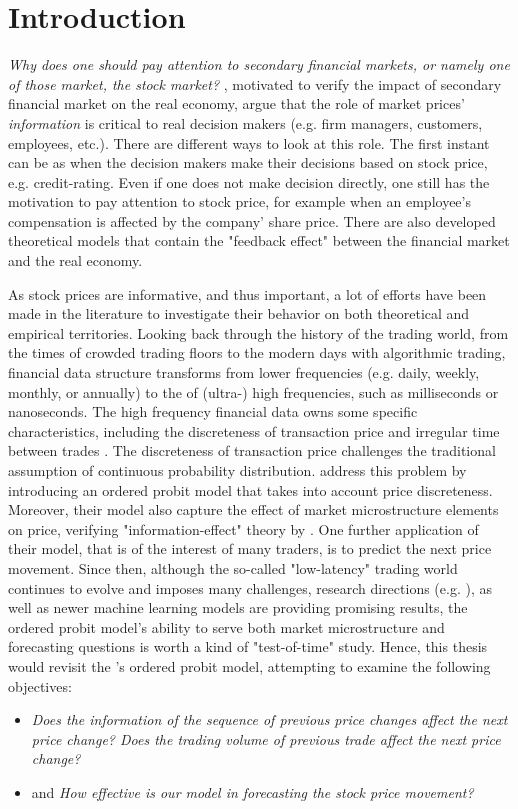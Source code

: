 \chapter{Introduction}\label{chap:introduction}

\textit{Why does one should pay attention to secondary financial markets, or namely one of those market, the stock market?} \citet{bondetal2012}, motivated to verify the impact of secondary financial market on the real economy, argue that the role of market prices' \textit{information} is critical to real decision makers (e.g. firm managers, customers, employees, etc.). There are different ways to look at this role. The first instant can be as when the decision makers make their decisions based on stock price, e.g. credit-rating. Even if one does not make decision directly, one still has the motivation to pay attention to stock price, for example when an employee's compensation is affected by the company' share price. There are also developed theoretical models that contain the "feedback effect" between the financial market and the real economy.

As stock prices are informative, and thus important, a lot of efforts have been made in the literature to investigate their behavior on both theoretical and empirical territories. Looking back through the history of the trading world, from the times of crowded trading floors to the modern days with algorithmic trading, financial data structure transforms from lower frequencies (e.g. daily, weekly, monthly, or annually) to the of (ultra-) high frequencies, such as milliseconds or nanoseconds. The high frequency financial data owns some specific characteristics, including the discreteness of transaction price and irregular time between trades \citep{tsay2013}. The discreteness of transaction price challenges the traditional assumption of continuous probability distribution. \citet{hausman1992} address this problem by introducing an ordered probit model that takes into account price discreteness. Moreover, their model also capture the effect of market microstructure elements on price, verifying "information-effect" theory by \citet{easleyohara1987}. One further application of their model, that is of the interest of many traders, is to predict the next price movement. Since then, although the so-called "low-latency" trading world continues to evolve and imposes many challenges, research directions (e.g. \citet{ohara2015}), as well as newer machine learning models are providing promising results, the ordered probit model's ability to serve both market microstructure and forecasting questions is worth a kind of "test-of-time" study. Hence, this thesis would revisit the \citet{hausman1992}'s ordered probit model, attempting to examine the following objectives:
\begin{itemize}
    \item \textit{Does the information of the sequence of previous price changes affect the next price change? Does the trading volume of previous trade affect the next price change?}
    \item and \textit{How effective is our model in forecasting the stock price movement?}
\end{itemize}

